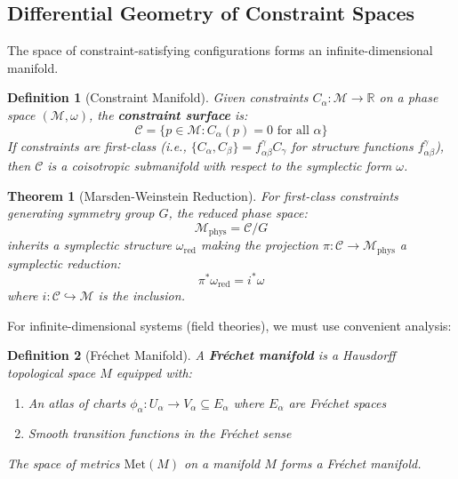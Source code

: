 \documentclass[11pt,a4paper]{article}
\newtheorem{theorem}{Theorem}[section]
\newtheorem{definition}{Definition}[section]
\theoremstyle{remark}
\theoremstyle{definition}
\begin{document}
\subsection{Differential Geometry of Constraint Spaces}

The space of constraint-satisfying configurations forms an infinite-dimensional manifold.

\begin{definition}[Constraint Manifold]
Given constraints $C_\alpha: \mathcal{M} \to \mathbb{R}$ on a phase space $(\mathcal{M}, \omega)$, the \textbf{constraint surface} is:
\begin{equation}
\mathcal{C} = \{p \in \mathcal{M} : C_\alpha(p) = 0 \text{ for all } \alpha\}
\end{equation}
If constraints are first-class (i.e., $\{C_\alpha, C_\beta\} = f^{\gamma}_{\alpha\beta} C_\gamma$ for structure functions $f^{\gamma}_{\alpha\beta}$), then $\mathcal{C}$ is a coisotropic submanifold with respect to the symplectic form $\omega$.
\end{definition}

\begin{theorem}[Marsden-Weinstein Reduction]
For first-class constraints generating symmetry group $G$, the reduced phase space:
\begin{equation}
\mathcal{M}_{\text{phys}} = \mathcal{C}/G
\end{equation}
inherits a symplectic structure $\omega_{\text{red}}$ making the projection $\pi: \mathcal{C} \to \mathcal{M}_{\text{phys}}$ a symplectic reduction:
\begin{equation}
\pi^* \omega_{\text{red}} = i^* \omega
\end{equation}
where $i: \mathcal{C} \hookrightarrow \mathcal{M}$ is the inclusion.
\end{theorem}

For infinite-dimensional systems (field theories), we must use convenient analysis:

\begin{definition}[Fréchet Manifold]
A \textbf{Fréchet manifold} is a Hausdorff topological space $M$ equipped with:
\begin{enumerate}[label=(\roman*)]
\item An atlas of charts $\phi_\alpha: U_\alpha \to V_\alpha \subseteq E_\alpha$ where $E_\alpha$ are Fréchet spaces
\item Smooth transition functions in the Fréchet sense
\end{enumerate}
The space of metrics $\text{Met}(M)$ on a manifold $M$ forms a Fréchet manifold.
\end{definition}
\end{document}
